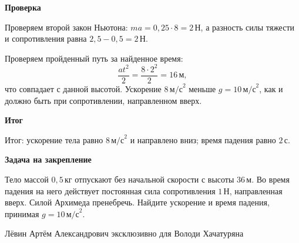 \documentclass[12pt,a4paper]{article}
\newcommand{\reviewfield}[1]{\par\smallskip\noindent\textbf{#1}\par}
\newcommand{\mathunit}[1]{\,\text{#1}}
\begin{document}
\reviewfield{Проверка}
Проверяем второй закон Ньютона: $ma=0{,}25\cdot8=2\mathunit{Н}$, а разность силы тяжести и сопротивления равна $2{,}5-0{,}5=2\mathunit{Н}$.

Проверяем пройденный путь за найденное время:
\[
\frac{at^2}{2}=\frac{8\cdot2^2}{2}=16\mathunit{м},
\]
что совпадает с данной высотой. Ускорение $8\,\text{м/с}^{2}$ меньше $g=10\,\text{м/с}^{2}$, как и должно быть при сопротивлении, направленном вверх.

\reviewfield{Итог}
\textcolor{teal!60!black}{Итог:} ускорение тела равно $8\,\text{м/с}^{2}$ и направлено вниз; время падения равно $2\mathunit{с}$.

\reviewfield{Задача на закрепление}
Тело массой $0{,}5\mathunit{кг}$ отпускают без начальной скорости с высоты $36\mathunit{м}$. Во время падения на него действует постоянная сила сопротивления $1\mathunit{Н}$, направленная вверх. Силой Архимеда пренебречь. Найдите ускорение и время падения, принимая $g=10\,\text{м/с}^{2}$.

\vfill
\begin{center}
{\small\color{muted}Лёвин Артём Александрович эксклюзивно для Володи Хачатуряна}
\end{center}
\end{document}
